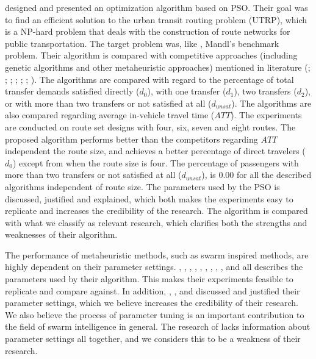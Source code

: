 \citet{kechagiopoulos14} designed and presented an optimization algorithm based on PSO. Their goal was to find an efficient solution to the urban transit routing problem (UTRP), which is a NP-hard problem that deals with the construction of route networks for public transportation. The target problem was, like \citet{nikolic14}, Mandl's benchmark problem. Their algorithm is compared with competitive approaches (including genetic algorithms and other metaheuristic approaches) mentioned in literature (\citet{baaj91}; \citet{chakroborty02}; \citet{kidwai98}; \citet{fan10}; \citet{fan09-2}; \citet{zhang10}; \citet{chew12}). The algorithms are compared with regard to the percentage of total transfer demands satisfied directly ($d_0$), with one transfer ($d_1$), two transfers ($d_2$), or with more than two transfers or not satisfied at all ($d_{unsat}$). The algorithms are also compared regarding average in-vehicle travel time ($ATT$). The experiments are conducted on route set designs with four, six, seven and eight routes. The proposed algorithm performs better than the competitors regarding $ATT$ independent the route size, and achieves a better percentage of direct travelers ($d_0$) except from when the route size is four. The percentage of passengers with more than two transfers or not satisfied at all ($d_{unsat}$), is $0.00$ for all the described algorithms independent of route size. The parameters used by the PSO is discussed, justified and explained, which both makes the experiments easy to replicate and increases the credibility of the research. The algorithm is compared with what we classify as relevant research, which clarifies both the strengths and weaknesses of their algorithm. \newline

The performance of metaheuristic methods, such as swarm inspired methods, are highly dependent on their parameter settings. \citet{hsiao04}, \citet{salehi-nezhad07}, \citet{tripathi09}, \citet{sedighpour14}, \citet{yang07}, \citet{salehinejad10}, \citet{jiang10}, \citet{poorzahedy11}, \citet{nikolic14}, and \citet{kechagiopoulos14} all describes the parameters used by their algorithm. This makes their experiments feasible to replicate and compare against. In addition, \citet{sedighpour14}, \citet{poorzahedy11}, and \citet{kechagiopoulos14} discussed and justified their parameter settings, which we believe increases the credibility of their research. We also believe the process of parameter tuning is an important contribution to the field of swarm intelligence in general. The research of \citet{dias14} lacks information about parameter settings all together, and we considers this to be a weakness of their research. 

